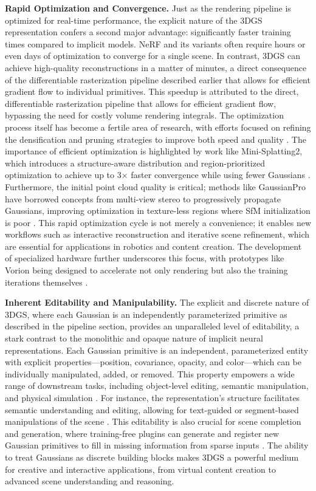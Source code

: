 \documentclass[11pt]{article}
\begin{document}
\textbf{Rapid Optimization and Convergence.} Just as the rendering pipeline is optimized for real-time performance, the explicit nature of the 3DGS representation confers a second major advantage: significantly faster training times compared to implicit models. NeRF and its variants often require hours or even days of optimization to converge for a single scene. In contrast, 3DGS can achieve high-quality reconstructions in a matter of minutes, a direct consequence of the differentiable rasterization pipeline described earlier that allows for efficient gradient flow to individual primitives. This speedup is attributed to the direct, differentiable rasterization pipeline that allows for efficient gradient flow, bypassing the need for costly volume rendering integrals. The optimization process itself has become a fertile area of research, with efforts focused on refining the densification and pruning strategies to improve both speed and quality \cite{ref42}. The importance of efficient optimization is highlighted by work like Mini-Splatting2, which introduces a structure-aware distribution and region-prioritized optimization to achieve up to 3× faster convergence while using fewer Gaussians \cite{ref43}. Furthermore, the initial point cloud quality is critical; methods like GaussianPro have borrowed concepts from multi-view stereo to progressively propagate Gaussians, improving optimization in texture-less regions where SfM initialization is poor \cite{ref44}. This rapid optimization cycle is not merely a convenience; it enables new workflows such as interactive reconstruction and iterative scene refinement, which are essential for applications in robotics and content creation. The development of specialized hardware further underscores this focus, with prototypes like Vorion being designed to accelerate not only rendering but also the training iterations themselves \cite{ref45}.

\textbf{Inherent Editability and Manipulability.} The explicit and discrete nature of 3DGS, where each Gaussian is an independently parameterized primitive as described in the pipeline section, provides an unparalleled level of editability, a stark contrast to the monolithic and opaque nature of implicit neural representations. Each Gaussian primitive is an independent, parameterized entity with explicit properties---position, covariance, opacity, and color---which can be individually manipulated, added, or removed. This property empowers a wide range of downstream tasks, including object-level editing, semantic manipulation, and physical simulation \cite{ref1,ref8}. For instance, the representation's structure facilitates semantic understanding and editing, allowing for text-guided or segment-based manipulations of the scene \cite{ref8}. This editability is also crucial for scene completion and generation, where training-free plugins can generate and register new Gaussian primitives to fill in missing information from sparse inputs \cite{ref46}. The ability to treat Gaussians as discrete building blocks makes 3DGS a powerful medium for creative and interactive applications, from virtual content creation to advanced scene understanding and reasoning.
\end{document}
